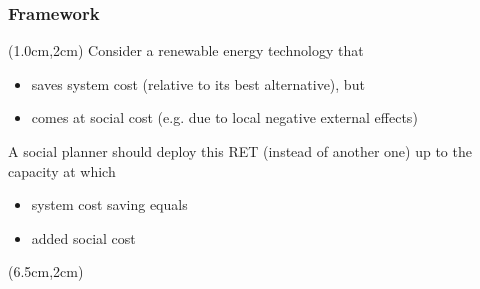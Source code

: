 \documentclass[aspectratio=1610, xcolor=dvipsnames,handout]{beamer} %
\begin{document}
    \begin{frame}
        \frametitle{Framework}

        \begin{textblock*}{5cm}
            (1.0cm,2cm)
            Consider a renewable energy technology that
            \begin{itemize}
                \item saves system cost (relative to its best alternative), but
                \item comes at social cost (e.g. due to local negative external effects)
            \end{itemize}
            \medskip

            A social planner should deploy this RET (instead of another one) up to the capacity at which
            \begin{itemize}
                \item system cost saving equals
                \item added social cost
            \end{itemize}
        \end{textblock*}

        \begin{textblock*}{8.0cm}
            (6.5cm,2cm)
        \end{textblock*}
    \end{frame}
\end{document}
